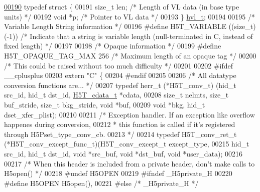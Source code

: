 \begin{DoxyCode}
\hyperlink{structhvl__t}{00190} \textcolor{keyword}{typedef} \textcolor{keyword}{struct }\{
00191     \textcolor{keywordtype}{size\_t} len; \textcolor{comment}{/* Length of VL data (in base type units) */}
00192     \textcolor{keywordtype}{void} *p;    \textcolor{comment}{/* Pointer to VL data */}
00193 \} \hyperlink{structhvl__t}{hvl\_t};
00194 
00195 \textcolor{comment}{/* Variable Length String information */}
00196 \textcolor{preprocessor}{#define H5T\_VARIABLE    ((size\_t)(-1))  }\textcolor{comment}{/* Indicate that a string is variable length (null-terminated in C,
       instead of fixed length) */}\textcolor{preprocessor}{}
00197 
00198 \textcolor{comment}{/* Opaque information */}
00199 \textcolor{preprocessor}{#define H5T\_OPAQUE\_TAG\_MAX      256     }\textcolor{comment}{/* Maximum length of an opaque tag */}\textcolor{preprocessor}{}
00200                                         \textcolor{comment}{/* This could be raised without too much difficulty */}
00201 
00202 \textcolor{preprocessor}{#ifdef \_\_cplusplus}
00203 \textcolor{keyword}{extern} \textcolor{stringliteral}{"C"} \{
00204 \textcolor{preprocessor}{#endif}
00205 
00206 \textcolor{comment}{/* All datatype conversion functions are... */}
00207 \textcolor{keyword}{typedef} herr\_t (*H5T\_conv\_t) (hid\_t src\_id, hid\_t dst\_id, \hyperlink{struct_h5_t__cdata__t}{H5T\_cdata\_t} *cdata,
00208       \textcolor{keywordtype}{size\_t} nelmts, \textcolor{keywordtype}{size\_t} buf\_stride, \textcolor{keywordtype}{size\_t} bkg\_stride, \textcolor{keywordtype}{void} *buf,
00209       \textcolor{keywordtype}{void} *bkg, hid\_t dset\_xfer\_plist);
00210 
00211 \textcolor{comment}{/* Exception handler.  If an exception like overflow happenes during conversion,}
00212 \textcolor{comment}{ * this function is called if it's registered through H5Pset\_type\_conv\_cb.}
00213 \textcolor{comment}{ */}
00214 \textcolor{keyword}{typedef} H5T\_conv\_ret\_t (*H5T\_conv\_except\_func\_t)(H5T\_conv\_except\_t except\_type,
00215     hid\_t src\_id, hid\_t dst\_id, \textcolor{keywordtype}{void} *src\_buf, \textcolor{keywordtype}{void} *dst\_buf, \textcolor{keywordtype}{void} *user\_data);
00216 
00217 \textcolor{comment}{/* When this header is included from a private header, don't make calls to H5open() */}
00218 \textcolor{preprocessor}{#undef H5OPEN}
00219 \textcolor{preprocessor}{#ifndef \_H5private\_H}
00220 \textcolor{preprocessor}{#define H5OPEN          H5open(),}
00221 \textcolor{preprocessor}{#else   }\textcolor{comment}{/* \_H5private\_H */}\textcolor{preprocessor}{}

\end{DoxyCode}
